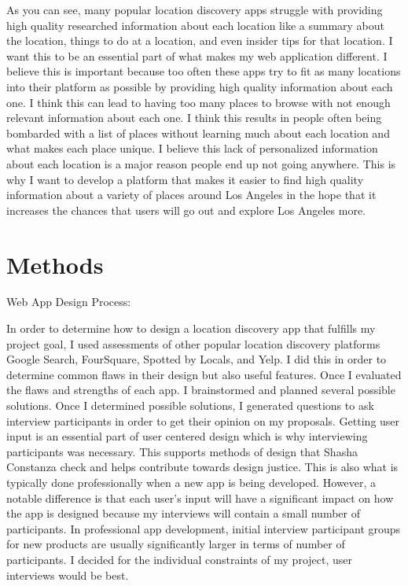 \documentclass[12pt,twocolumn]{article}
\begin{document}
As you can see, many popular location discovery apps struggle with providing high quality researched information about each location like a summary about the location, things to do at a location, and even insider tips for that location. I want this to be an essential part of what makes my web application different. I believe this is important because too often these apps try to fit as many locations into their platform as possible by providing high quality information about each one. I think this can lead to having too many places to browse with not enough relevant information about each one. I think this results in people often being bombarded with a list of places without learning much about each location and what makes each place unique. I believe this lack of personalized information about each location is a major reason people end up not going anywhere. This is why I want to develop a platform that makes it easier to find high quality information about a variety of places around Los Angeles in the hope that it increases the chances that users will go out and explore Los Angeles more.


\section{Methods}
Web App Design Process:

In order to determine how to design a location discovery app that fulfills my project goal, I used assessments of other popular location discovery platforms Google Search, FourSquare, Spotted by Locals, and Yelp. I did this in order to determine common flaws in their design but also useful features.  Once I evaluated the flaws and strengths of each app. I brainstormed and planned several possible solutions. Once I determined possible solutions, I generated questions to ask interview participants  in order to get their opinion on my proposals. Getting user input is an essential part of user centered design which is why interviewing participants was necessary. This supports methods of design that Shasha Constanza check and helps contribute towards design justice\cite{Chock20}. This is also what is typically done professionally when a new app is being developed. However, a notable difference is that each user’s input will have a significant impact on how the app is designed because my interviews will contain a small number of participants. In professional app development, initial interview participant groups for new products are usually significantly larger in terms of number of participants. I decided for the individual constraints of my project, user interviews would be best.
\end{document}
